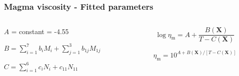 \documentclass{beamer}
\begin{document}
\begin{frame}
  \frametitle{Magma viscosity - Fitted parameters}

  \begin{columns}[t]

    \begin{column}{0.5\paperwidth}

      \centering
      
      $A$ = constant = -4.55
      
      \vspace{0.5cm}

      $B = \sum_{i = 1}^{7} b_{i} M_{i} + \sum_{j = 1}^{3} b_{1j} M_{1j}$ 

      \vspace{0.5cm}

      $C = \sum_{i = 1}^{6} c_{i} N_{i} + c_{11} N_{11}$

      \vspace{1cm}

    \end{column}

    \begin{column}{0.5\paperwidth}

      $$ \log \eta_{\text{m}} = A + \frac{B(\mathbf{X})}{T - C(\mathbf{X})}$$

      $$\eta_{\text{m}} = 10 ^{A + B(\mathbf{X})/[T - C(\mathbf{X})]}$$

    \end{column}

  \end{columns}
  

\end{frame}
\end{document}
